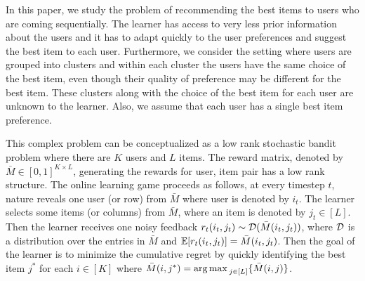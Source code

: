 In this paper, we study the problem of recommending the best items to users who are coming sequentially. The learner has access to very less prior information about the users and it has to adapt quickly to the user preferences and suggest the best item to each user. Furthermore, we consider the setting where users are grouped into clusters and within each cluster the users have the same choice of the best item, even though their quality of preference may be different for the best item. These clusters along with the choice of the best item for each user are unknown to the learner.  Also, we assume that each user has a single best item preference.

	This complex problem can be conceptualized as a low rank stochastic bandit problem where there are $K$ users and $L$ items. The reward matrix, denoted by $\bar{M}\in [0,1]^{K\times L}$,  generating the rewards for user, item pair has a low rank structure. The online learning game proceeds as follows, at every timestep $t$,  nature reveals one user (or row) from $\bar{M}$ where user is denoted by $i_t$. The learner selects some items (or columns) from $\bar{M}$, where an item is denoted by $j_t\in [L]$. Then the learner receives one noisy feedback $r_{t}(i_t,j_t)\sim \mathcal{D}(\bar{M}(i_t,j_t))$, where $\mathcal{D}$ is a distribution over the entries in $\bar{M}$ and $\mathbb{E}[r_{t}(i_t,j_t)] = \bar{M}(i_t,j_t)$. Then the goal of the learner is to minimize the cumulative regret by quickly identifying the best item $j^*$ for each $i\in [K]$ where $\bar{M}(i,j^*) = \operatorname*{arg\,max\,} _{j\in[L]}\lbrace \bar{M}(i,j) \rbrace$. 
	
	